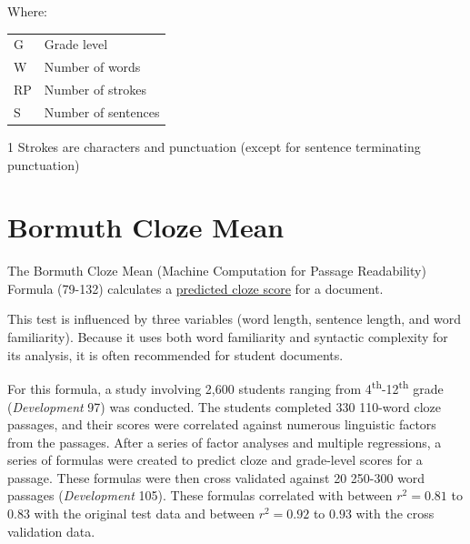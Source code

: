 \documentclass[
]{book}
\theoremstyle{definition}
\theoremstyle{definition}
\theoremstyle{definition}
\theoremstyle{definition}
\theoremstyle{remark}
\begin{document}
Where:

\begin{table}
\centering
\begin{threeparttable}
\begin{tabular}[t]{l>{\raggedright\arraybackslash}p{10cm}}
\toprule
G & Grade level\\
W & Number of words\\
RP & Number of strokes\\
S & Number of sentences\\
\bottomrule
\end{tabular}
\begin{tablenotes}
\item[1] Strokes are characters and punctuation (except for sentence terminating punctuation)
\end{tablenotes}
\end{threeparttable}
\end{table}


\newpage

\hypertarget{bormuth-cloze-mean-machine-passage}{%
\section{\texorpdfstring{Bormuth Cloze Mean}{Bormuth Cloze Mean}}\label{bormuth-cloze-mean-machine-passage}}

The Bormuth Cloze Mean (Machine Computation for Passage Readability) Formula (79-132) calculates a \protect\hyperlink{cloze}{predicted cloze score} for a document.

This test is influenced by three variables (word length, sentence length, and word familiarity). Because it uses both word familiarity and syntactic complexity for its analysis, it is often recommended for student documents.

For this formula, a study involving 2,600 students ranging from 4\textsuperscript{th}-12\textsuperscript{th} grade (\emph{Development} 97) was conducted. The students completed 330 110-word cloze passages, and their scores were correlated against numerous linguistic factors from the passages. After a series of factor analyses and multiple regressions, a series of formulas were created to predict cloze and grade-level scores for a passage. These formulas were then cross validated against 20 250-300 word passages (\emph{Development} 105). These formulas correlated with between \(r^2 = 0.81\) to \(0.83\) with the original test data and between \(r^2 = 0.92\) to \(0.93\) with the cross validation data.
\end{document}
